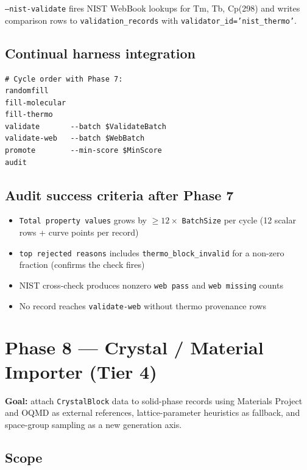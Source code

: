 \documentclass[11pt, a4paper]{article}
\begin{document}
\texttt{--nist-validate} fires NIST WebBook lookups for Tm, Tb, Cp(298) and writes
comparison rows to \texttt{validation\_records} with \texttt{validator\_id='nist\_thermo'}.

\subsection{Continual harness integration}

\begin{lstlisting}[language={}]
# Cycle order with Phase 7:
randomfill
fill-molecular
fill-thermo
validate       --batch $ValidateBatch
validate-web   --batch $WebBatch
promote        --min-score $MinScore
audit
\end{lstlisting}

\subsection{Audit success criteria after Phase 7}

\begin{itemize}[leftmargin=*, itemsep=2pt]
  \item \texttt{Total property values} grows by $\geq 12 \times$ \texttt{BatchSize} per cycle
		(12 scalar rows + curve points per record)
  \item \texttt{top rejected reasons} includes \texttt{thermo\_block\_invalid} for a
		non-zero fraction (confirms the check fires)
  \item NIST cross-check produces nonzero \texttt{web pass} and \texttt{web missing} counts
  \item No record reaches \texttt{validate-web} without thermo provenance rows
\end{itemize}

\section{Phase 8 --- Crystal / Material Importer (Tier 4)}

\begin{tierbox}
\textbf{Goal:} attach \texttt{CrystalBlock} data to solid-phase records using
Materials Project and OQMD as external references, lattice-parameter heuristics
as fallback, and space-group sampling as a new generation axis.
\end{tierbox}

\subsection{Scope}
\end{document}
